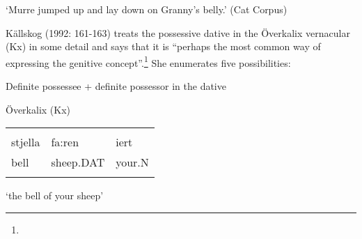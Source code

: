 \begin{styleTranslation}
‘Murre jumped up and lay down on Granny’s belly.’ (Cat Corpus)

\end{styleTranslation}

\begin{styleBodyTextFirst}
Källskog (1992: 161-163) treats the possessive dative in the Överkalix vernacular (Kx) in some detail and says that it is “perhaps the most common way of expressing the genitive concept”.\footnote{} She enumerates five possibilities:

\end{styleBodyTextFirst}


\begin{listWWNumxiileveli}
\item {}

\begin{styleListii}
Definite possessee + definite possessor in the dative

\end{styleListii}

\end{listWWNumxiileveli}

\begin{listWWNumileveli}
\item {}

\begin{styleExample}
Överkalix (Kx)

\end{styleExample}

\end{listWWNumileveli}

\begin{listWWNumxcileveli}
\item {}

\end{listWWNumxcileveli}

\begin{tabular}{lll}
\lsptoprule
\multicolumn{3}{l}{{\bfseries\scshape possessee}

}\\
stjella & fa:ren & iert\\
bell & sheep.DAT & your.N\\
\lspbottomrule
\end{tabular}

\begin{styleTranslation}
‘the bell of your sheep’

\end{styleTranslation}

